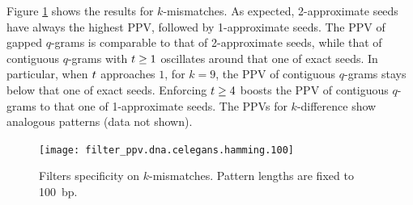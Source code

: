 Figure \ref{fig:filter-ppv-hamming-celegans} shows the results for $k$-mismatches.
As expected, 2-approximate seeds have always the highest PPV, followed by 1-approximate seeds.
The PPV of gapped $q$-grams is comparable to that of 2-approximate seeds, while that of contiguous $q$-grams with $t \geq 1$ oscillates around that one of exact seeds.
In particular, when $t$ approaches $1$, \eg for $k = 9$, the PPV of contiguous $q$-grams stays below that one of exact seeds.
Enforcing $t \geq 4$ boosts the PPV of contiguous $q$-grams to that one of 1-approximate seeds.
The PPVs for $k$-difference show analogous patterns (data not shown).

\begin{figure}[b]
\begin{center}
\caption[Filters specificity on $k$-mismatches]{Filters specificity on $k$-mismatches. Pattern lengths are fixed to 100~bp.}
\label{fig:filter-ppv-hamming-celegans}
\texttt{[image: filter\_ppv.dna.celegans.hamming.100]}
\end{center}
\end{figure}


